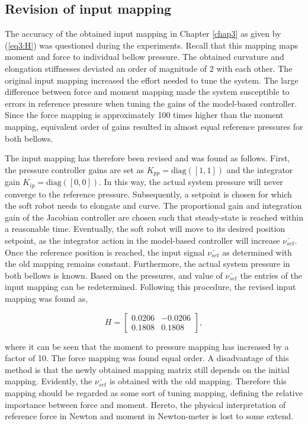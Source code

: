 \subsection*{Revision of input mapping}

The accuracy of the obtained input mapping in Chapter \ref{chap3} as given by (\ref{eq3:H}) was questioned during the experiments. Recall that this mapping maps moment and force to individual bellow pressure. The obtained curvature and elongation stiffnesses deviated an order of magnitude of 2 with each other. The original input mapping increased the effort needed to tune the system. The large difference between force and moment mapping made the system susceptible to errors in reference pressure when tuning the gains of the model-based controller. Since the force mapping is approximately 100 times higher than the moment mapping, equivalent order of gains resulted in almost equal reference pressures for both bellows.

The input mapping has therefore been revised and was found as follows. First, the pressure controller gains are set as $K_{pp} =\text{diag}([1,1])$ and the integrator gain $K_{ip} = \text{diag}([0,0])$. In this way, the actual system pressure will never converge to the reference pressure. Subsequently, a setpoint is chosen for which the soft robot needs to elongate and curve. The proportional gain and integration gain of the Jacobian controller are chosen such that steady-state is reached within a reasonable time. Eventually, the soft robot will move to its desired position setpoint, as the integrator action in the model-based controller will increase $\bar{\nu_{set}}$. Once the reference position is reached, the input signal $\bar{\nu_{set}}$ as determined with the old mapping remains constant. Furthermore, the actual system pressure in both bellows is known. Based on the pressures, and value of $\bar{\nu_{set}}$ the entries of the input mapping can be redetermined. Following this procedure, the revised input mapping was found as,

\begin{equation}
    H = \begin{bmatrix} 	0.0206 &  -0.0206 \\ 
	0.1808 & 0.1808 \end{bmatrix},
    \label{eq4:revisedH}
\end{equation}

where it can be seen that the moment to pressure mapping has increased by a factor of 10. The force mapping was found equal order. A disadvantage of this method is that the newly obtained mapping matrix still depends on the initial mapping. Evidently, the $\bar{\nu_{set}}$ is obtained with the old mapping. Therefore this mapping should be regarded as some sort of tuning mapping, defining the relative importance between force and moment. Hereto, the physical interpretation of reference force in Newton and moment in Newton-meter is lost to some extend. 

